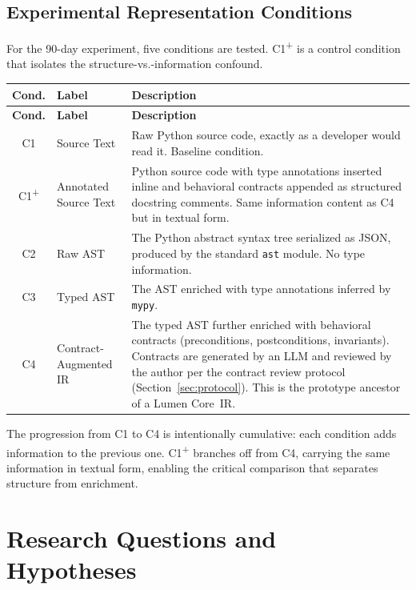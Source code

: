 \documentclass[11pt]{article}
\begin{document}
\subsection*{Experimental Representation Conditions}

For the 90-day experiment, five conditions are tested.
C1\textsuperscript{+} is a control condition that isolates the
structure-vs.-information confound.

\begin{longtable}{@{}clp{6.5cm}@{}}
  \toprule
  \textbf{Cond.} & \textbf{Label} & \textbf{Description} \\
  \midrule
  \endfirsthead
  \toprule
  \textbf{Cond.} & \textbf{Label} & \textbf{Description} \\
  \midrule
  \endhead
  C1 & Source Text &
      Raw Python source code, exactly as a developer would read it.
      Baseline condition. \\
  \addlinespace
  C1\textsuperscript{+} & Annotated Source Text &
      Python source code with type annotations inserted inline and
      behavioral contracts appended as structured docstring comments.
      Same information content as C4 but in textual form. \\
  \addlinespace
  C2 & Raw AST &
      The Python abstract syntax tree serialized as JSON, produced by
      the standard \texttt{ast} module.  No type information. \\
  \addlinespace
  C3 & Typed AST &
      The AST enriched with type annotations inferred by
      \texttt{mypy}. \\
  \addlinespace
  C4 & Contract-Augmented IR &
      The typed AST further enriched with behavioral contracts
      (preconditions, postconditions, invariants).  Contracts are
      generated by an LLM and reviewed by the author per the contract
      review protocol (Section~\ref{sec:protocol}).  This is the
      prototype ancestor of a Lumen Core~IR. \\
  \bottomrule
\end{longtable}

The progression from C1 to C4 is intentionally cumulative: each
condition adds information to the previous one.
C1\textsuperscript{+} branches off from C4, carrying the same
information in textual form, enabling the critical comparison
that separates structure from enrichment.


\section{Research Questions and Hypotheses}
\label{sec:rq}
\end{document}
